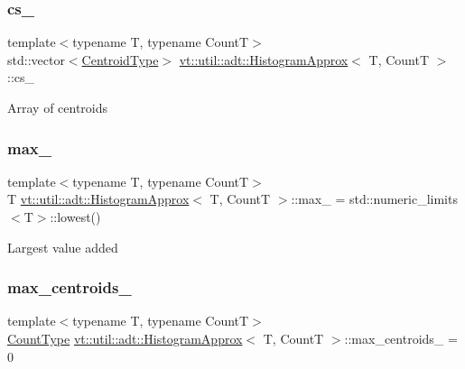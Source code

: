 \subsubsection{\texorpdfstring{cs\+\_\+}{cs\_}}
{\footnotesize\ttfamily template$<$typename T, typename CountT$>$ \\
std\+::vector$<$\hyperlink{structvt_1_1util_1_1adt_1_1_histogram_approx_aabacbad5be3a407cb00938f079177b95}{Centroid\+Type}$>$ \hyperlink{structvt_1_1util_1_1adt_1_1_histogram_approx}{vt\+::util\+::adt\+::\+Histogram\+Approx}$<$ T, CountT $>$\+::cs\+\_\+\hspace{0.3cm}{\ttfamily [private]}}

Array of centroids \mbox{\label{structvt_1_1util_1_1adt_1_1_histogram_approx_a4bab4f7bffe5cd03a70be4013bd18403}} 
\subsubsection{\texorpdfstring{max\+\_\+}{max\_}}
{\footnotesize\ttfamily template$<$typename T, typename CountT$>$ \\
T \hyperlink{structvt_1_1util_1_1adt_1_1_histogram_approx}{vt\+::util\+::adt\+::\+Histogram\+Approx}$<$ T, CountT $>$\+::max\+\_\+ = std\+::numeric\+\_\+limits$<$T$>$\+::lowest()\hspace{0.3cm}{\ttfamily [private]}}

Largest value added \mbox{\label{structvt_1_1util_1_1adt_1_1_histogram_approx_a080a663250287f2c4bb1f2db58d60cf3}} 
\subsubsection{\texorpdfstring{max\+\_\+centroids\+\_\+}{max\_centroids\_}}
{\footnotesize\ttfamily template$<$typename T, typename CountT$>$ \\
\hyperlink{structvt_1_1util_1_1adt_1_1_histogram_approx_aa2fb74665588d311da76dd821f2912c6}{Count\+Type} \hyperlink{structvt_1_1util_1_1adt_1_1_histogram_approx}{vt\+::util\+::adt\+::\+Histogram\+Approx}$<$ T, CountT $>$\+::max\+\_\+centroids\+\_\+ = 0\hspace{0.3cm}{\ttfamily [private]}}

